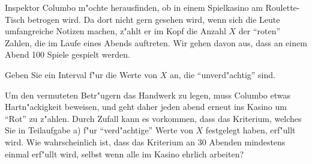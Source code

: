 Inspektor Columbo m"ochte herausfinden, ob in einem Spielkasino
am Roulette-Tisch betrogen wird.
Da dort nicht gern gesehen wird, wenn sich die Leute umfangreiche Notizen
machen, z"ahlt er im Kopf die Anzahl $X$ der ``roten'' Zahlen,
die im Laufe eines Abends auftreten.
Wir gehen davon aus, dass an einem Abend 100 Spiele gespielt werden.
\begin{teilaufgaben}
\item Geben Sie ein Interval f"ur die Werte von $X$ an, die ``unverd"achtig''
sind.
\item Um den vermuteten Betr"ugern das Handwerk zu legen, muss Columbo
etwas Hartn"ackigkeit beweisen, und geht daher jeden abend erneut
ins Kasino um ``Rot'' zu z"ahlen. Durch Zufall kann es vorkommen, dass
das Kriterium, welches Sie in Teilaufgabe a) f"ur ``verd"achtige''
Werte von $X$ festgelegt haben, erf"ullt wird. Wie wahrscheinlich ist,
dass das Kriterium an 30 Abenden mindestens einmal erf"ullt wird, selbst
wenn alle im Kasino ehrlich arbeiten?
\end{teilaufgaben}

